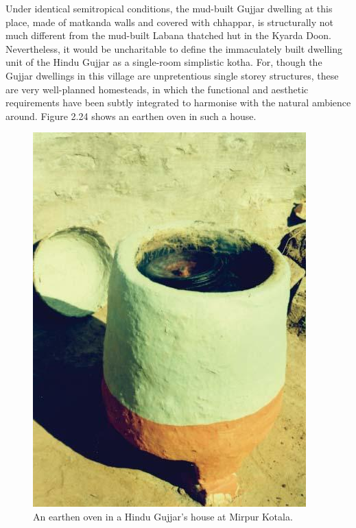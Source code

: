 Under identical semitropical conditions, the mud-built Gujjar dwelling at this place, made of matkanda walls and covered with chhappar, is structurally not much different from the mud-built Labana thatched hut in the Kyarda Doon. Nevertheless, it would be uncharitable to define the immaculately built dwelling unit of the Hindu Gujjar as a single-room simplistic kotha. For, though the Gujjar dwellings in this village are unpretentious single storey structures, these are very well-planned homesteads, in which the functional and aesthetic requirements have been subtly integrated to harmonise with the natural ambience around. Figure 2.24 shows an earthen oven in such a house.

\begin{figure}[!htbp]
\includegraphics[scale=.31]{images/chap02-24.jpg}
\caption{An earthen oven in a Hindu Gujjar’s house at Mirpur Kotala.}\label{chap02-fig24}
\end{figure}

